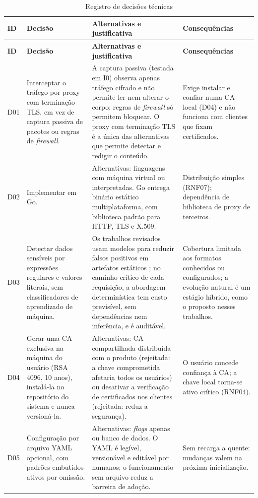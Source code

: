 {\small
\begin{longtable}{|p{1.0cm}|p{4.2cm}|p{5.4cm}|p{3.3cm}|}
\caption{Registro de decisões técnicas}\label{tab:adr}\\
\hline
\textbf{ID} & \textbf{Decisão} & \textbf{Alternativas e justificativa} & \textbf{Consequências} \\ \hline
\endfirsthead
\hline
\textbf{ID} & \textbf{Decisão} & \textbf{Alternativas e justificativa} & \textbf{Consequências} \\ \hline
\endhead
D01  & Interceptar o tráfego por proxy com terminação TLS, em vez de captura passiva de pacotes ou regras de \textit{firewall}. & A captura passiva (testada em I0) observa apenas tráfego cifrado e não permite ler nem alterar o corpo; regras de \textit{firewall} só permitem bloquear. O proxy com terminação TLS é a única das alternativas que permite detectar e redigir o conteúdo. & Exige instalar e confiar numa CA local (D04) e não funciona com clientes que fixam certificados. \\ \hline
D02  & Implementar em Go. & Alternativas: linguagens com máquina virtual ou interpretadas. Go entrega binário estático multiplataforma, com biblioteca padrão para HTTP, TLS e X.509. & Distribuição simples (RNF07); dependência de biblioteca de proxy de terceiros. \\ \hline
D03  & Detectar dados sensíveis por expressões regulares e valores literais, sem classificadores de aprendizado de máquina. & Os trabalhos revisados usam modelos para reduzir falsos positivos em artefatos estáticos \cite{rahman2025secret,tsebak2025enhancing}; no caminho crítico de cada requisição, a abordagem determinística tem custo previsível, sem dependências nem inferência, e é auditável. & Cobertura limitada aos formatos conhecidos ou configurados; a evolução natural é um estágio híbrido, como o proposto nesses trabalhos. \\ \hline
D04  & Gerar uma CA exclusiva na máquina do usuário (RSA 4096, 10 anos), instalá-la no repositório do sistema e nunca versioná-la. & Alternativas: CA compartilhada distribuída com o produto (rejeitada: a chave comprometida afetaria todos os usuários) ou desativar a verificação de certificados nos clientes (rejeitada: reduz a segurança). & O usuário concede confiança à CA; a chave local torna-se ativo crítico (RNF04). \\ \hline
D05  & Configuração por arquivo YAML opcional, com padrões embutidos ativos por omissão. & Alternativas: \textit{flags} apenas ou banco de dados. O YAML é legível, versionável e editável por humanos; o funcionamento sem arquivo reduz a barreira de adoção. & Sem recarga a quente: mudanças valem na próxima inicialização. \\ \hline

\end{longtable}}
